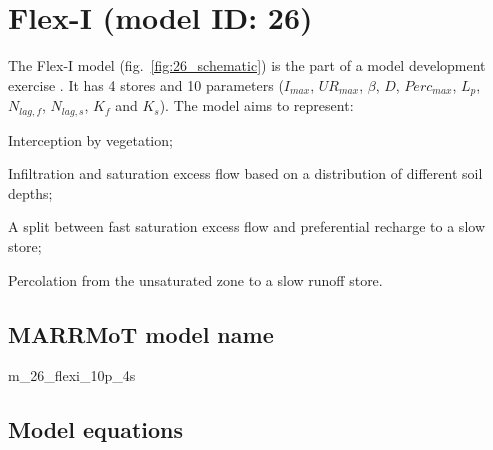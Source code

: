 \section{Flex-I (model ID: 26)}
The Flex-I model (fig.~\ref{fig:26_schematic}) is the part of a model development exercise \citep{Fenicia2008}. It has 4 stores and 10 parameters ($I_{max}$, $UR_{max}$, $\beta$, $D$, $Perc_{max}$, $L_p$, $N_{lag,f}$, $N_{lag,s}$, $K_f$ and $K_s$). The model aims to represent:

\begin{itemizecompact}
\item Interception by vegetation;
\item Infiltration and saturation excess flow based on a distribution of different soil depths;
\item A split between fast saturation excess flow and preferential recharge to a slow store;
\item Percolation from the unsaturated zone to a slow runoff store.
\end{itemizecompact}

\subsection{MARRMoT model name}
m\_26\_flexi\_10p\_4s \\

\subsection{Model equations}

